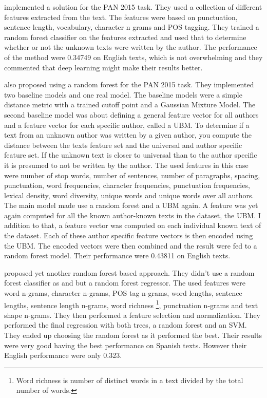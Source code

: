 \cite{maitra2015} implemented a solution for the PAN 2015 task. They used a
collection of different features extracted from the text. The features were
based on punctuation, sentence length, vocabulary, character n grams and
\gls{POS} tagging. They trained a random forest classifier on the features
extracted and used that to determine whether or not the unknown texts were
written by the author. The performance of the method were 0.34749 on English
texts, which is not overwhelming and they commented that deep learning might
make their results better.

\cite{pacheco2015} also proposed using a random forest for the PAN 2015 task.
They implemented two baseline models and one real model. The baseline models
were a simple distance metric with a trained cutoff point and a Gaussian Mixture
Model. The second baseline model was about defining a general feature vector for
all authors and a feature vector for each specific author, called a \gls{UBM}.
To determine if a text from an unknown author was written by a given author,
you compute the distance between the texts feature set and the universal and
author specific feature set. If the unknown text is closer to universal than to
the author specific it is presumed to not be written by the author. The used
features in this case were number of stop words, number of sentences, number
of paragraphs, spacing, punctuation, word frequencies, character frequencies,
punctuation frequencies, lexical density, word diversity, unique words and
unique words over all authors. The main model made use a random forest and a
\gls{UBM} again. A feature was yet again computed for all the known author-known
texts in the dataset, the \gls{UBM}. I addition to that, a feature vector was
computed on each individual known text of the dataset. Each of these author
specific feature vectors is then encoded using the \gls{UBM}. The encoded
vectors were then combined and the result were fed to a random forest model.
Their performance were 0.43811 on English texts.

\cite{bartoli2015b} proposed yet another random forest based approach.
They didn't use a random forest classifier as \cite{maitra2015} and
\cite{pacheco2015} but a random forest regressor. The used features were word
n-grams, character n-grams, \gls{POS} tag n-grams, word lengths, sentence
lengths, sentence length n-grams, word richness \footnote{Word richness is
number of distinct words in a text divided by the total number of words.},
punctuation n-grams and text shape n-grams. They then performed a feature
selection and normalization. They performed the final regression with both
trees, a random forest and an SVM. They ended up choosing the random forest as
it performed the best. Their results were very good having the best performance
on Spanish texts. However their English performance were only 0.323.

